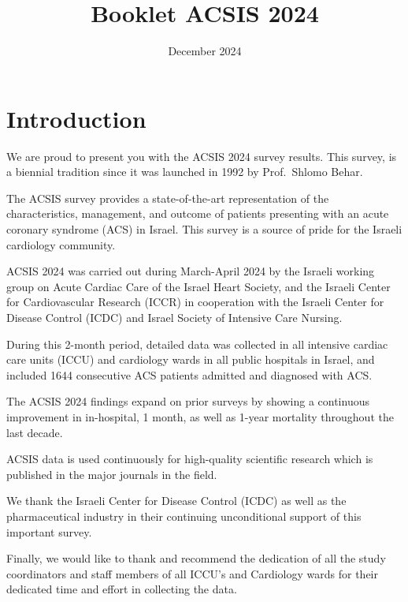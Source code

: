\documentclass[
]{article}
\title{Booklet ACSIS 2024}
\author{}
\date{\vspace{-2.5em}December 2024}
\begin{document}
\maketitle

{
\setcounter{tocdepth}{2}
\tableofcontents
}
\captionsetup[table]{labelformat=empty}

\pagebreak

\section{Introduction}\label{introduction}

We are proud to present you with the ACSIS 2024 survey results. This
survey, is a biennial tradition since it was launched in 1992 by
Prof.~Shlomo Behar.

The ACSIS survey provides a state-of-the-art representation of the
characteristics, management, and outcome of patients presenting with an
acute coronary syndrome (ACS) in Israel. This survey is a source of
pride for the Israeli cardiology community.

ACSIS 2024 was carried out during March-April 2024 by the Israeli
working group on Acute Cardiac Care of the Israel Heart Society, and the
Israeli Center for Cardiovascular Research (ICCR) in cooperation with
the Israeli Center for Disease Control (ICDC) and Israel Society of
Intensive Care Nursing.

During this 2-month period, detailed data was collected in all intensive
cardiac care units (ICCU) and cardiology wards in all public hospitals
in Israel, and included 1644 consecutive ACS patients admitted and
diagnosed with ACS.

The ACSIS 2024 findings expand on prior surveys by showing a continuous
improvement in in-hospital, 1 month, as well as 1-year mortality
throughout the last decade.

ACSIS data is used continuously for high-quality scientific research
which is published in the major journals in the field.

We thank the Israeli Center for Disease Control (ICDC) as well as the
pharmaceutical industry in their continuing unconditional support of
this important survey.

Finally, we would like to thank and recommend the dedication of all the
study coordinators and staff members of all ICCU's and Cardiology wards
for their dedicated time and effort in collecting the data.

~

~
\end{document}
